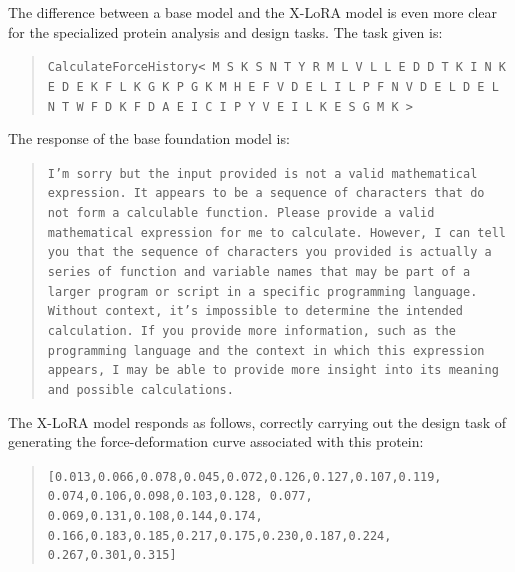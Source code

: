 The difference between a base model and the X-LoRA model is even more clear for the specialized protein analysis and design tasks. The task given is:
\begin{quote}
\small\texttt{CalculateForceHistory< M S K S N T Y R M L V L L E D D T K I N K E D E K F L K G K P G K M H E F V D E L I L P F N V D E L D E L N T W F D K F D A E I C I P Y V E I L K E S G M K > }
\end{quote}
The response of the base foundation model is:
\begin{quote}
\small\texttt{I'm sorry but the input provided is not a valid mathematical expression. It appears to be a sequence of characters that do not form a calculable function. Please provide a valid mathematical expression for me to calculate.
\newline\newline
However, I can tell you that the sequence of characters you provided is actually a series of function and variable names that may be part of a larger program or script in a specific programming language. Without context, it's impossible to determine the intended calculation.
\newline\newline
If you provide more information, such as the programming language and the context in which this expression appears, I may be able to provide more insight into its meaning and possible calculations. }
\end{quote}
The X-LoRA model responds as follows, correctly carrying out the design task of generating the force-deformation curve associated with this protein:
\begin{quote}
\small\texttt{[0.013,0.066,0.078,0.045,0.072,0.126,0.127,0.107,0.119, 
0.074,0.106,0.098,0.103,0.128,
0.077, 0.069,0.131,0.108,0.144,0.174, 
0.166,0.183,0.185,0.217,0.175,0.230,0.187,0.224,
0.267,0.301,0.315]}
\end{quote}

